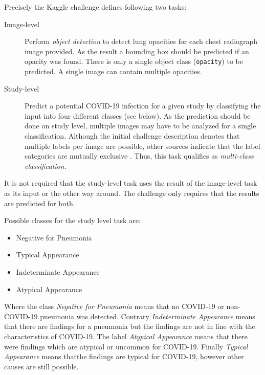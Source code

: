 Precisely the Kaggle challenge defines following two tasks:

\begin{description}
    \item[Image-level] Perform \textit{object detection} to detect lung opacities for each chest radiograph image provided. As the result a bounding box should be predicted if an opacity was found. There is only a single object class (\texttt{opacity}) to be predicted. A single image can contain multiple opacities.
    \item[Study-level] Predict a potential COVID-19 infection for a given study by classifying the input into four different classes (see below). As the prediction should be done on study level, multiple images may have to be analyzed for a single classification. Although the initial challenge description denotes that multiple labels per image are possible, other sources indicate that the label categories are mutually exclusive \autocite{litmanovich2020review, SIIMKaggleAnnotation}. Thus, this task qualifies as \textit{multi-class classification}.
\end{description}

It is not required that the study-level task uses the result of the image-level task as its input or the other way around. The challenge only requires that the results are predicted for both.

Possible classes for the study level task are:

\begin{itemize}
    \item Negative for Pneumonia
    \item Typical Appearance
    \item Indeterminate Appearance
    \item Atypical Appearance
\end{itemize}

Where the class \textit{Negative for Pneumonia} means that no COVID-19 or non-COVID-19 pneumonia was detected. Contrary \textit{Indeterminate Appearance} means that there are findings for a pneumonia but the findings are not in line with the characteristics of COVID-19. The label \textit{Atypical Appearance} means that there were findings which are atypical or uncommon for COVID-19. Finally \textit{Typical Appearance} means thatthe findings are typical for COVID-19, however other causes are still possible.

